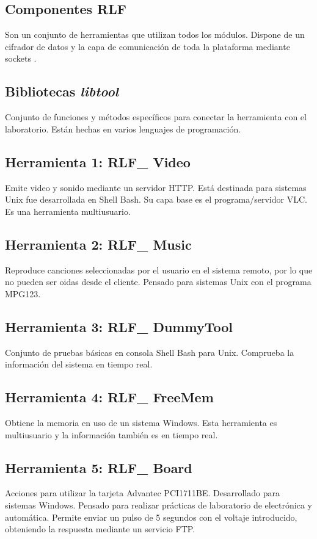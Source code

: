 \subsection*{Componentes RLF}
Son un conjunto de herramientas que utilizan todos los módulos. 
Dispone de un cifrador  de datos y la capa de 
comunicación de toda la plataforma mediante sockets .

\subsection*{Bibliotecas \emph{libtool} }
Conjunto de funciones y métodos específicos para conectar la 
herramienta con el laboratorio. Están hechas en varios lenguajes de 
programación.

\subsection*{Herramienta 1: RLF\_ Video}
Emite video y sonido mediante un servidor HTTP. Está destinada para 
sistemas Unix fue desarrollada en Shell Bash. Su capa base es el 
programa/servidor VLC. Es una herramienta multiusuario.

\subsection*{Herramienta 2: RLF\_ Music}
Reproduce canciones seleccionadas por el usuario en el sistema remoto, 
por lo que no pueden ser oidas desde el cliente. Pensado para sistemas 
Unix con el programa MPG123.

\subsection*{Herramienta 3: RLF\_ DummyTool}
Conjunto de pruebas básicas en consola Shell Bash para Unix. Comprueba 
la información del sistema en tiempo real.

\subsection*{Herramienta 4: RLF\_ FreeMem}
Obtiene la memoria en uso de un sistema Windows. Esta herramienta es 
multiusuario y la información también es en tiempo real.

\subsection*{Herramienta 5: RLF\_ Board}
Acciones para utilizar la tarjeta Advantec PCI1711BE. Desarrollado para 
sistemas Windows. Pensado para realizar prácticas de laboratorio de 
electrónica y automática. Permite enviar un pulso de 5 segundos con 
el voltaje introducido, obteniendo la respuesta mediante un servicio 
FTP.

